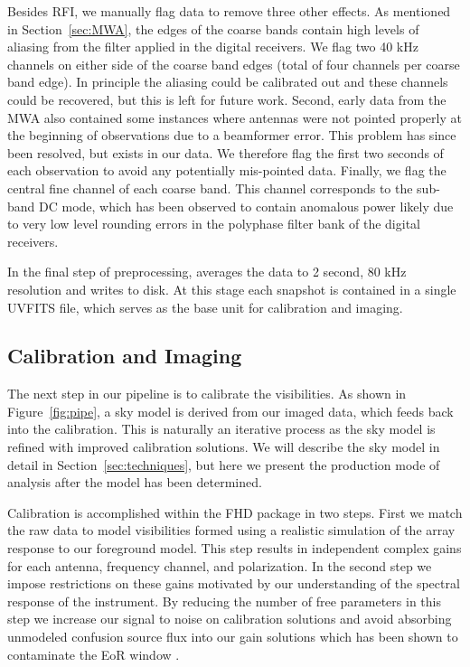 \documentclass[iop]{emulateapj}
\begin{document}
Besides RFI, we manually flag data to remove three other effects. As mentioned in 
Section~\ref{sec:MWA}, the edges of the coarse bands contain high levels of aliasing from 
the filter applied in the digital receivers. We flag two 40 kHz channels on either side of the 
coarse band edges (total of four channels per coarse band edge). In principle the aliasing 
could be calibrated out and these channels could be recovered, but this is left for future 
work. Second, early data from the MWA also contained some instances where antennas 
were not pointed properly at the beginning of observations due to a beamformer error. This 
problem has since been resolved, but exists in our data. We therefore flag the first two 
seconds of each observation to avoid any potentially mis-pointed data. 
Finally, we flag the central fine channel of each coarse band. This channel corresponds
to the sub-band DC mode, which has been observed to contain anomalous power likely
due to very low level rounding errors in the polyphase filter bank of the digital receivers.

In the final step of preprocessing, \cotter averages the data to 2 second, 80 kHz resolution 
and writes to disk. At this stage each snapshot is contained in a single UVFITS file, which 
serves as the base unit for calibration and imaging.


\subsection{Calibration and Imaging}\label{subsec:cal_imaging}
The next step in our pipeline is to calibrate the visibilities. As shown in Figure~\ref{fig:pipe}, 
a sky model is derived from our imaged data, which feeds back into the calibration. This is 
naturally an iterative process as the sky model is refined with improved calibration 
solutions. We will describe the sky model in detail in Section~\ref{sec:techniques}, but here 
we present the production mode of analysis after the model has been determined.

Calibration is accomplished within the FHD package in two steps. First we match the raw 
data to model visibilities formed using a realistic simulation of the array response to our 
foreground model. This step results in independent complex gains for each antenna, 
frequency channel, and polarization. In the second step we impose restrictions on these 
gains motivated by our understanding of the spectral response of the instrument. By 
reducing the number of free parameters in this step we increase our signal to noise on 
calibration solutions and avoid absorbing unmodeled confusion source flux into our gain 
solutions which has been shown to contaminate the EoR window \citep{Barry:2016}. 
\end{document}
